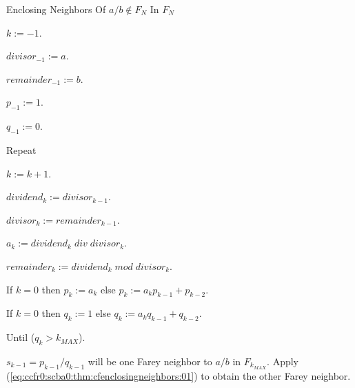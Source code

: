 \begin{vworkalgorithmstatementpar}{Enclosing Neighbors Of \mbox{\boldmath $a/b \notin F_N$} 
                                 In \mbox{\boldmath $F_N$}}
\label{alg:ccfr0:scba0:cfenclosingneighborsfn}
\begin{alglvl0}
\item $k := -1$.
\item $divisor_{-1} := a$.
\item $remainder_{-1} := b$.
\item $p_{-1} := 1$.
\item $q_{-1} := 0$.

\item Repeat

\begin{alglvl1}
\item $k := k + 1$.
\item $dividend_k := divisor_{k-1}$.
\item $divisor_k  := remainder_{k-1}$.
\item $a_k :=  dividend_k \; div \; divisor_k$.
\item $remainder_k := dividend_k \; mod \; divisor_k$.
\item If $k=0$ then $p_k := a_k$ else $p_k := a_k p_{k-1} + p_{k-2}$.
\item If $k=0$ then $q_k := 1$ else $q_k := a_k q_{k-1} + q_{k-2}$.
\end{alglvl1}

\item Until ($q_k > k_{MAX}$).
\item $s_{k-1} = p_{k-1}/q_{k-1}$ will be one Farey neighbor to $a/b$ in $F_{k_{MAX}}$.
      Apply (\ref{eq:ccfr0:scba0:thm:cfenclosingneighbors:01}) 
	  to obtain the other Farey neighbor.
\end{alglvl0}
\end{vworkalgorithmstatementpar}

